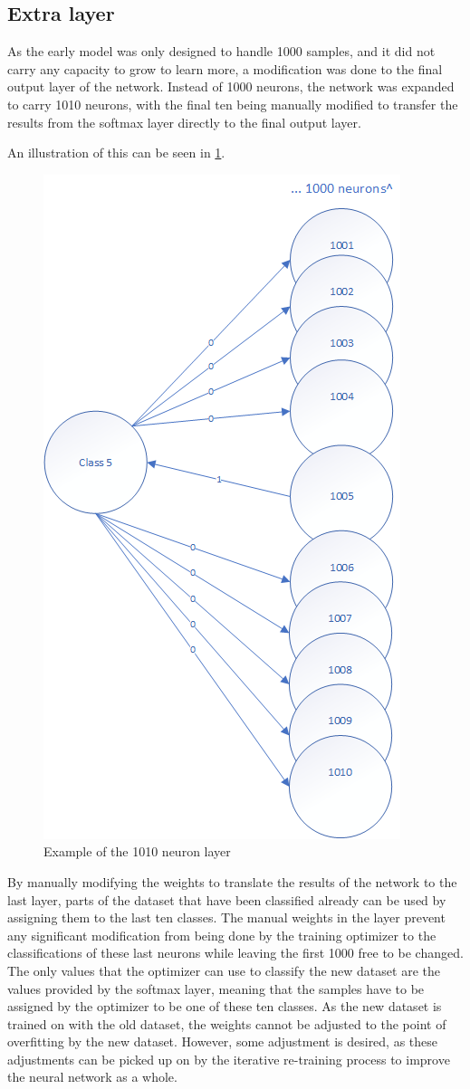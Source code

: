 \subsection{Extra layer} %
\label{me:exlayer}
As the early model was only designed to handle 1000 samples, and it did not carry any capacity to grow to learn more, a modification was done to the final output layer of the network.
Instead of 1000 neurons, the network was expanded to carry 1010 neurons, with the final ten being manually modified to transfer the results from the softmax layer directly to the final output layer.

An illustration of this can be seen in \cref{fig:extralayerexample}.

\begin{figure}[htbp]  %
  \centering
  \includegraphics[width=.5\textwidth]{figures/Drawing1.png}
  \caption{Example of the 1010 neuron layer}
  \label{fig:extralayerexample}
\end{figure}

By manually modifying the weights to translate the results of the network to the last layer, parts of the dataset that have been classified already can be used by assigning them to the last ten classes.
The manual weights in the layer prevent any significant modification from being done by the training optimizer to the classifications of these last neurons while leaving the first 1000 free to be changed.
The only values that the optimizer can use to classify the new dataset are the values provided by the softmax layer, meaning that the samples have to be assigned by the optimizer to be one of these ten classes.
As the new dataset is trained on with the old dataset, the weights cannot be adjusted to the point of overfitting by the new dataset.
However, some adjustment is desired, as these adjustments can be picked up on by the iterative re-training process to improve the neural network as a whole.

